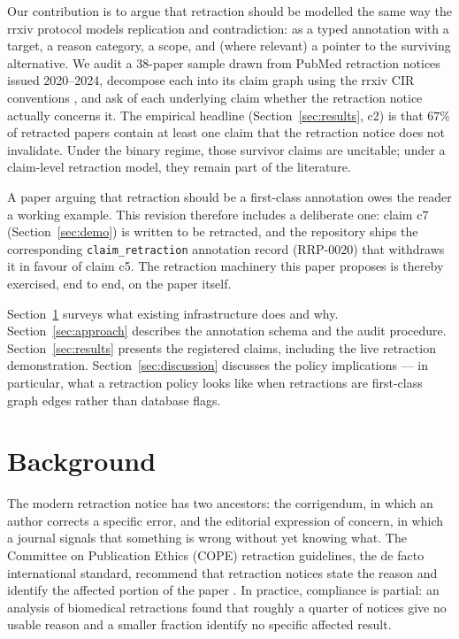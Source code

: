 \documentclass{rrxiv}
\begin{document}
Our contribution is to argue that retraction should be modelled the same way the rrxiv protocol models replication and contradiction: as a typed annotation with a target, a reason category, a scope, and (where relevant) a pointer to the surviving alternative. We audit a 38-paper sample drawn from PubMed retraction notices issued 2020--2024, decompose each into its claim graph using the rrxiv CIR conventions \cite{rrxivwhitepaper}, and ask of each underlying claim whether the retraction notice actually concerns it. The empirical headline (Section~\ref{sec:results}, c2) is that $67\%$ of retracted papers contain at least one claim that the retraction notice does not invalidate. Under the binary regime, those survivor claims are uncitable; under a claim-level retraction model, they remain part of the literature.

A paper arguing that retraction should be a first-class annotation owes the reader a working example. This revision therefore includes a deliberate one: claim c7 (Section~\ref{sec:demo}) is written to be retracted, and the repository ships the corresponding \texttt{claim\_retraction} annotation record (RRP-0020) that withdraws it in favour of claim c5. The retraction machinery this paper proposes is thereby exercised, end to end, on the paper itself.

Section~\ref{sec:background} surveys what existing infrastructure does and why. Section~\ref{sec:approach} describes the annotation schema and the audit procedure. Section~\ref{sec:results} presents the registered claims, including the live retraction demonstration. Section~\ref{sec:discussion} discusses the policy implications --- in particular, what a retraction policy looks like when retractions are first-class graph edges rather than database flags.

\section{Background}
\label{sec:background}
The modern retraction notice has two ancestors: the corrigendum, in which an author corrects a specific error, and the editorial expression of concern, in which a journal signals that something is wrong without yet knowing what. The Committee on Publication Ethics (COPE) retraction guidelines, the de facto international standard, recommend that retraction notices state the reason and identify the affected portion of the paper \cite{cope}. In practice, compliance is partial: an analysis of biomedical retractions found that roughly a quarter of notices give no usable reason and a smaller fraction identify no specific affected result.
\end{document}
